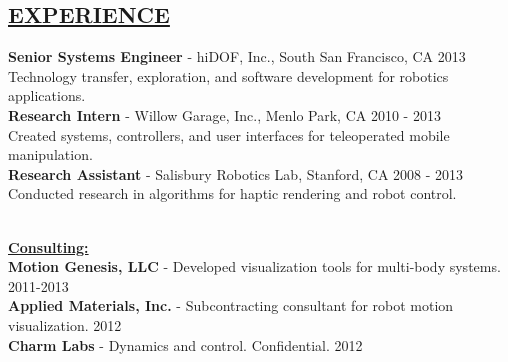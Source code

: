 \documentclass[line,margin]{res}
\newcommand{\CVOnly}[1]{}
\newcommand{\CVOnly}[1]{#1}
\newcommand{\hide}[1]{}
\begin{document}
\begin{resume}
\section{\underline{EXPERIENCE}} 
\vspace{1.0pc}
{\bf Senior Systems Engineer} -  hiDOF, Inc., South San Francisco, CA  \hfill 2013
\\[0.0pc]Technology transfer, exploration, and software development for robotics applications.
%
\\[0.4pc]{\bf Research Intern} - Willow Garage, Inc., Menlo Park, CA \hfill 2010 - 2013
\\[0.0pc]Created systems, controllers, and user interfaces for teleoperated mobile manipulation.
%
\\[0.4pc]{\bf Research Assistant} - Salisbury Robotics Lab, Stanford, CA \hfill 2008 - 2013
\\[0.0pc]Conducted research in algorithms for haptic rendering and robot control.
\CVOnly{\\[0.0pc]Implemented miniature stereo camera sensor hardware for a robot gripper.}
%
\CVOnly{
\\[0.4pc]{\bf Electrical Engineering Intern} - Qual-Tron, Inc., Tulsa, OK \hfill 2006 - 2007
\\[0.0pc] Designed and implemented test procedures for IR and magnetic sensor products.
\\[0.0pc]Led redesign of a magnetic sensor product to reduce cost and simplify assembly.}
%
\hide{
\\[0.4pc]{\bf Summer Intern} - Atmel Corporation \hfill 2005
\\[0.4pc]{\bf Summer Research Intern} - NASA Glenn Research Center \hfill 2004%
}
%
\\[0.4pc]{\bf \underline{Consulting:}}
\\[0.2pc]{\bf Motion Genesis, LLC} - Developed visualization tools for multi-body systems. \hfill 2011-2013
\\[0.0pc]{\bf Applied Materials, Inc.} - Subcontracting consultant for robot motion visualization. \hfill 2012
\\[0.0pc]{\bf Charm Labs} - Dynamics and control. Confidential. \hfill 2012
%

%
%

\end{resume}
\end{document}
